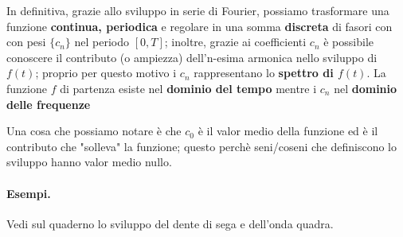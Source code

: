 In definitiva, grazie allo sviluppo in serie di Fourier, possiamo trasformare una funzione \textbf{continua, periodica} e regolare in una
somma \textbf{discreta} di fasori con con pesi $\{c_n\}$ nel periodo $[0, T]$; inoltre, grazie ai coefficienti $c_n$ è possibile
conoscere il contributo (o ampiezza) dell'n-esima armonica nello sviluppo di $f(t)$; proprio per questo motivo i $c_n$ rappresentano
lo \textbf{spettro di $f(t)$}. La funzione $f$ di partenza esiste nel \textbf{dominio del tempo} mentre i $c_n$ nel \textbf{dominio delle frequenze}


Una cosa che possiamo notare è che $c_0$ è il valor medio della funzione ed è il contributo che "solleva" la funzione; questo perchè seni/coseni che definiscono
lo sviluppo hanno valor medio nullo.\\

\paragraph{Esempi.} Vedi sul quaderno lo sviluppo del dente di sega e dell'onda quadra.

